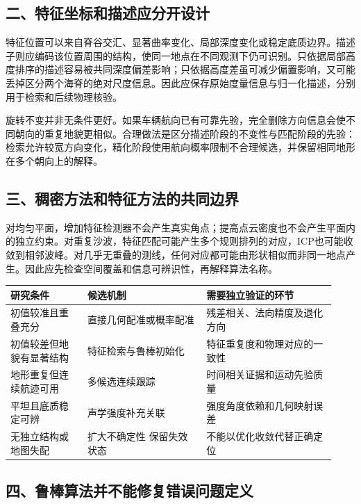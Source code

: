 \hypertarget{ux4e8cux7279ux5f81ux5750ux6807ux548cux63cfux8ff0ux5e94ux5206ux5f00ux8bbeux8ba1}{%
\subsection{二、特征坐标和描述应分开设计}\label{ux4e8cux7279ux5f81ux5750ux6807ux548cux63cfux8ff0ux5e94ux5206ux5f00ux8bbeux8ba1}}

特征位置可以来自脊谷交汇、显著曲率变化、局部深度变化或稳定底质边界。描述子则应编码该位置周围的结构，使同一地点在不同观测下仍可识别。只依据局部高度排序的描述容易被共同深度偏差影响；只依据高度差虽可减少偏置影响，又可能丢掉区分两个海脊的绝对尺度信息。因此应保存原始度量信息与归一化描述，分别用于检索和后续物理核验。

旋转不变并非无条件更好。如果车辆航向已有可靠先验，完全删除方向信息会使不同朝向的重复地貌更相似。合理做法是区分描述阶段的不变性与匹配阶段的先验：检索允许较宽方向变化，精化阶段使用航向概率限制不合理候选，并保留相同地形在多个朝向上的解释。

\hypertarget{ux4e09ux7a20ux5bc6ux65b9ux6cd5ux548cux7279ux5f81ux65b9ux6cd5ux7684ux5171ux540cux8fb9ux754c}{%
\subsection{三、稠密方法和特征方法的共同边界}\label{ux4e09ux7a20ux5bc6ux65b9ux6cd5ux548cux7279ux5f81ux65b9ux6cd5ux7684ux5171ux540cux8fb9ux754c}}

对均匀平面，增加特征检测器不会产生真实角点；提高点云密度也不会产生平面内的独立约束。对重复沙波，特征匹配可能产生多个规则排列的对应，ICP也可能收敛到相邻波峰。对几乎无重叠的测线，任何对应都可能由形状相似而非同一地点产生。因此应先检查空间覆盖和信息可辨识性，再解释算法名称。

\begin{longtable}[]{@{}p{0.22\linewidth}p{0.34\linewidth}p{0.37\linewidth}@{}}
\toprule
研究条件 & 候选机制 & 需要独立验证的环节\tabularnewline
\midrule
\endhead
初值较准且重叠充分 & 直接几何配准或概率配准 & 残差相关、法向精度及退化方向\tabularnewline
初值较差但地貌有显著结构 & 特征检索与鲁棒初始化 & 特征重复度和物理对应的一致性\tabularnewline
地形重复但连续航迹可用 & 多候选连续跟踪 & 时间相关证据和运动先验质量\tabularnewline
平坦且底质稳定可辨 & 声学强度补充关联 & 强度角度依赖和几何映射误差\tabularnewline
无独立结构或地图失配 & 扩大不确定性 保留失效状态 & 不能以优化收敛代替正确定位\tabularnewline
\bottomrule
\end{longtable}

\hypertarget{ux56dbux9c81ux68d2ux7b97ux6cd5ux5e76ux4e0dux80fdux4feeux590dux9519ux8befux95eeux9898ux5b9aux4e49}{%
\subsection{四、鲁棒算法并不能修复错误问题定义}\label{ux56dbux9c81ux68d2ux7b97ux6cd5ux5e76ux4e0dux80fdux4feeux590dux9519ux8befux95eeux9898ux5b9aux4e49}}

